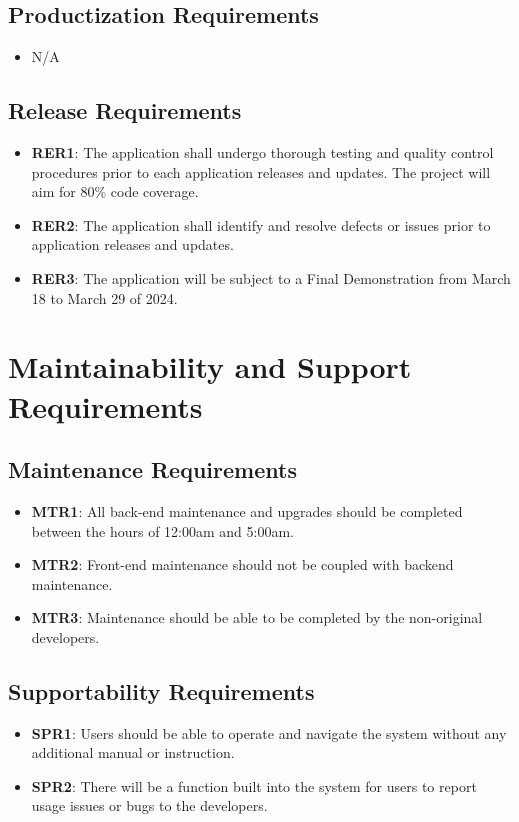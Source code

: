 \documentclass[12pt]{article}
\begin{document}
\subsection{Productization Requirements}
\begin{itemize}
    \item N/A
\end{itemize}
\subsection{Release Requirements}
\begin{itemize}
    \item \textbf{RER1}: The application shall undergo thorough testing and quality control procedures prior to each application releases and updates. The project will aim for 80\% code coverage.
    \item \textbf{RER2}: The application shall identify and resolve defects or issues prior to application releases and updates.
    \item \textbf{RER3}: The application will be subject to a Final Demonstration from March 18 to March 29 of 2024.
\end{itemize}

\section{Maintainability and Support Requirements}
\subsection{Maintenance Requirements}
\begin{itemize}
  \item \textbf{MTR1}: All back-end maintenance and upgrades should be completed between the hours of 12:00am and 5:00am.
  \item \textbf{MTR2}: Front-end maintenance should not be coupled with backend maintenance.
  \item \textbf{MTR3}: Maintenance should be able to be completed by the non-original developers.
\end{itemize}
\subsection{Supportability Requirements}
\begin{itemize}
  \item \textbf{SPR1}: Users should be able to operate and navigate the system without any additional manual or instruction.
  \item \textbf{SPR2}: There will be a function built into the system for users to report usage issues or bugs to the developers.
\end{itemize}
\end{document}

